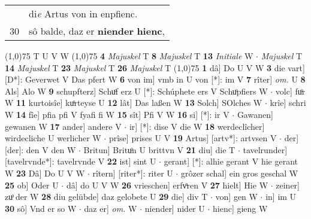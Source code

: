 \documentclass[8pt,a4paper,notitlepage]{article}
\begin{document}
\begin{table}[ht]
\begin{minipage}[t]{0.5\linewidth}
\begin{tabular}{rl}
 & di\textit{e} Artus von in enpfienc.\\ 
30 & sô balde, daz er \textbf{niender} \textbf{hienc},\\ 
\end{tabular}
\scriptsize
\line(1,0){75} \newline
T U V W \newline
\line(1,0){75} \newline
\textbf{4} \textit{Majuskel} T  \textbf{8} \textit{Majuskel} T  \textbf{13} \textit{Initiale} W   $\cdot$ \textit{Majuskel} T  \textbf{14} \textit{Majuskel} T  \textbf{23} \textit{Majuskel} T  \textbf{26} \textit{Majuskel} T  \newline
\line(1,0){75} \newline
\textbf{1} dâ] Do U V W \textbf{3} die vart] [D*]: Geverwet V Das pfert W \textbf{6} von im] vmb in U von [*]: im V \textbf{7} rîter] \textit{om.} U \textbf{8} Als] Alo W \textbf{9} schupfterz] Schuͦf erz U [*]: Schúphete ers V Schuͦpfiers W  $\cdot$ volc] fuͦr W \textbf{11} kurtoisîe] kuͦrteyse U \textbf{12} lât] Das laßen W \textbf{13} Solch] SOlches W  $\cdot$ krîe] schri W \textbf{14} fîe] pfia pfi V fyafi fi W \textbf{15} sît] Pfi V W \textbf{16} si] [*]: ir V  $\cdot$ Gawanen] gewanen W \textbf{17} ander] andere V  $\cdot$ ir] [*]: dise V die W \textbf{18} werdeclîcher] wirdecliche U werlicher W  $\cdot$ prîse] prises U V \textbf{19} Artus] [artv*]: artvsen V  $\cdot$ der] [der]: den V den W  $\cdot$ Britun] Brituͦn U brittvn V \textbf{21} diu] die T  $\cdot$ tavelrunder] [tavelrvnde*]: tavelrvnde V \textbf{22} ist] sint U  $\cdot$ gerant] [*]: alhie gerant V hie gerant W \textbf{23} Dâ] Do U V W  $\cdot$ rîtern] [riter*]: riter U  $\cdot$ grôzer schal] ein gros geschal W \textbf{25} ob] Oder U  $\cdot$ dâ] do U V W \textbf{26} vrieschen] erfvͦren V \textbf{27} hielt] Hie W  $\cdot$ zeiner] zuͦ der W \textbf{28} diu gelübde] daz gelobete U \textbf{29} die] div T  $\cdot$ von] gen W  $\cdot$ in] im U \textbf{30} sô] Vnd er so W  $\cdot$ daz er] \textit{om.} W  $\cdot$ niender] nider U  $\cdot$ hienc] gieng W \newline
\end{minipage}
\end{table}
\end{document}
